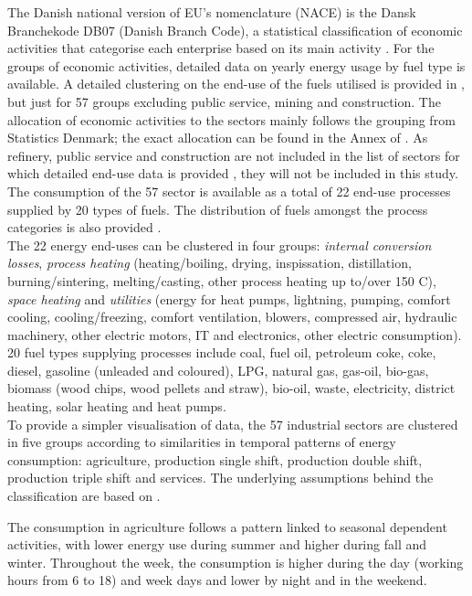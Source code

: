 \documentclass[review]{elsarticle}
\begin{document}
The Danish national version of EU's nomenclature (NACE) is the Dansk Branchekode DB07 (Danish Branch Code), a statistical classification of economic activities that categorise each enterprise based on its main activity \cite{DanmarksStatistik2013}. 
For the groups of economic activities, detailed data on yearly energy usage by fuel type is available. A detailed clustering on the end-use of the fuels utilised is provided in \cite{VM2015}, but just for 57 groups excluding public service, mining and construction. The allocation of economic activities to the sectors mainly follows the grouping from Statistics Denmark; the exact allocation can be found in the Annex of \cite{VM2015}. As refinery, public service and construction are not included in the list of sectors for which detailed end-use data is provided \cite{VM2015}, they will not be included in this study.
\\
The consumption of the 57 sector is available as a total of 22 end-use processes supplied by 20 types of fuels. The distribution of fuels amongst the process categories is also provided \cite{VM2015}.
\\
The 22 energy end-uses can be clustered in four groups: \textit{internal conversion losses}, \textit{process heating} (heating/boiling, drying, inspissation, distillation, burning/sintering, melting/casting, other process heating up to/over 150 C), \textit{space heating} and \textit{utilities} (energy for heat pumps, lightning, pumping, comfort cooling, cooling/freezing, comfort ventilation, blowers, compressed air, hydraulic machinery, other electric motors, IT and electronics, other electric consumption).
\\
20 fuel types supplying processes include coal, fuel oil, petroleum coke, coke, diesel, gasoline (unleaded and coloured), LPG, natural gas, gas-oil, bio-gas, biomass (wood chips, wood pellets and straw), bio-oil, waste, electricity, district heating, solar heating and heat pumps.
\\
To provide a simpler visualisation of data, the 57 industrial sectors are clustered in five groups according to similarities in temporal patterns of energy consumption: agriculture, production single shift, production double shift, production triple shift and services. The underlying assumptions behind the classification are based on \cite{VM2016,Wiese2017}.  

The consumption in agriculture follows a pattern linked to seasonal dependent activities, with lower energy use during summer and higher during fall and winter. Throughout the week, the consumption is higher during the day (working hours from 6 to 18) and week days and lower by night and in the weekend.
\end{document}
